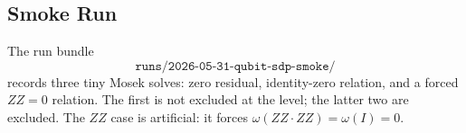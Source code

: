 \subsection{Smoke Run}

The run bundle
\[
  \texttt{runs/2026-05-31-qubit-sdp-smoke/}
\]
records three tiny Mosek solves: zero residual, identity-zero relation, and a
forced \(ZZ=0\) relation.  The first is not excluded at the level; the latter
two are excluded.  The \(ZZ\) case is artificial: it forces
\(\omega(ZZ\cdot ZZ)=\omega(I)=0\).
